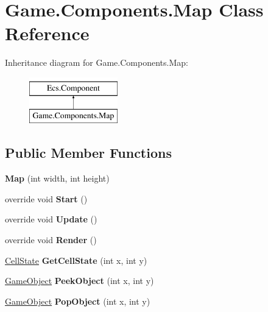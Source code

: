 \hypertarget{class_game_1_1_components_1_1_map}{}\section{Game.\+Components.\+Map Class Reference}
\label{class_game_1_1_components_1_1_map}
Inheritance diagram for Game.\+Components.\+Map\+:\begin{figure}[H]
\begin{center}
\leavevmode
\includegraphics[height=2.000000cm]{class_game_1_1_components_1_1_map}
\end{center}
\end{figure}
\subsection*{Public Member Functions}
\begin{DoxyCompactItemize}
\item 
\mbox{\label{class_game_1_1_components_1_1_map_a8122de6273464b91b3cde875c9ba7e15}} 
{\bfseries Map} (int width, int height)
\item 
\mbox{\label{class_game_1_1_components_1_1_map_a9bb57937d513bfae5fb51a1477ef8456}} 
override void {\bfseries Start} ()
\item 
\mbox{\label{class_game_1_1_components_1_1_map_a23340727d22afd422ed047a0d0d1e184}} 
override void {\bfseries Update} ()
\item 
\mbox{\label{class_game_1_1_components_1_1_map_afc6ca1cbba37b885fecc747f1d3a51c8}} 
override void {\bfseries Render} ()
\item 
\mbox{\label{class_game_1_1_components_1_1_map_a0a50acd39192416888cf43d2f0d513b2}} 
\mbox{\hyperlink{namespace_game_1_1_data_structures_a24fec17346a5ad535ffe81e59a617f57}{Cell\+State}} {\bfseries Get\+Cell\+State} (int x, int y)
\item 
\mbox{\label{class_game_1_1_components_1_1_map_a10b22835af2f71512386eab23b5027cb}} 
\mbox{\hyperlink{class_ecs_1_1_game_object}{Game\+Object}} {\bfseries Peek\+Object} (int x, int y)
\item 
\mbox{\label{class_game_1_1_components_1_1_map_ad1294a28a4ebcad1087c7a29484e31e6}} 
\mbox{\hyperlink{class_ecs_1_1_game_object}{Game\+Object}} {\bfseries Pop\+Object} (int x, int y)
\end{DoxyCompactItemize}
